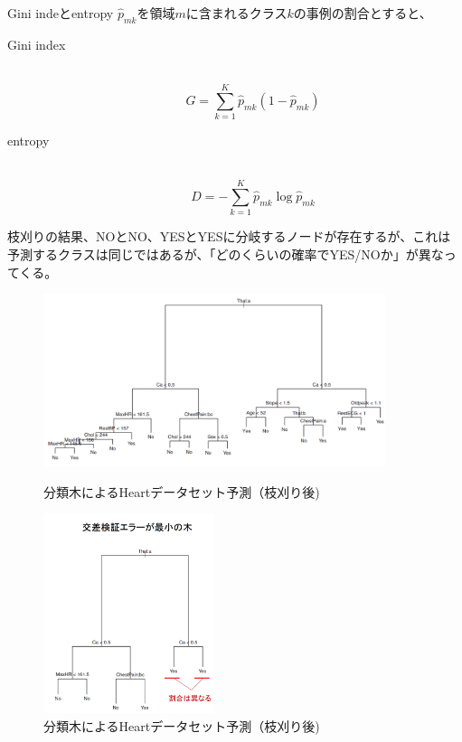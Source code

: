 \documentclass[uplatex]{jsarticle}
\begin{document}
\begin{itembox}[l]{Gini indeとentropy}
  $\hat{p}_{mk}$を領域$m$に含まれるクラス$k$の事例の割合とすると、
  \begin{description}
    \item [Gini index]\mbox{}\\
    $$G = \sum_{k=1}^K\hat{p}_{mk}(1 - \hat{p}_{mk})$$
    \item [entropy]\mbox{}\\
    $$D = -\sum_{k=1}^K \hat{p}_{mk}\log{\hat{p}_{mk}}$$
  \end{description}
\end{itembox}

枝刈りの結果、NOとNO、YESとYESに分岐するノードが存在するが、これは予測するクラスは同じではあるが、「どのくらいの確率でYES/NOか」が異なってくる。

\begin{figure}[htbp]
\begin{minipage}{0.7\hsize}
 \begin{center}
  \includegraphics[width=100mm]{img/class_orig.png}
 \end{center}
 \caption{分類木によるHeartデータセット予測（枝刈り後)}
 \label{fig:one}
\end{minipage}
\begin{minipage}{0.3\hsize}
 \begin{center}
  \includegraphics[width=50mm]{img/class_tree.png}
 \end{center}
 \caption{分類木によるHeartデータセット予測（枝刈り後)}
 \label{fig:two}
\end{minipage}
\end{figure}
\end{document}
